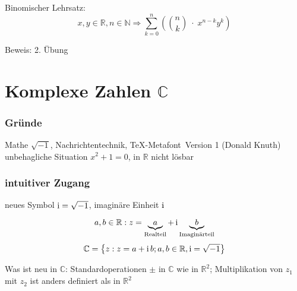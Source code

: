 \begin{proposition} Binomischer Lehrsatz:
 \begin{equation*} x,y \in \mathbb{R}, n \in \mathbb{N} \Rightarrow \sum_{k=0}^n \left( {n \choose k} \;\cdot\; x^{n-k}y^k \right) \end{equation*}
\end{proposition}
%
Beweis: 2. Übung

\section{Komplexe Zahlen $\mathbb{C}$}

\subsubsection*{Gründe}

Mathe $\sqrt{-1}$, Nachrichtentechnik, \TeX-Metafont\  Version 1 (Donald Knuth)\\
unbehagliche Situation $x^2+1=0$, in $\mathbb{R}$ nicht lösbar

\subsubsection*{intuitiver Zugang}

neues Symbol $\operatorname{i} = \sqrt{-1}$, imaginäre Einheit $\operatorname{i}$

\begin{definition}
  \begin{equation*} a, b \in \mathbb{R}: z = \underbrace{a}_\text{Realteil} + \operatorname{i} \underbrace{b}_\text{Imaginärteil} \end{equation*}
  \begin{equation*} \mathbb{C} = \left\{ z : z = a+\operatorname{i} b; a,b \in \mathbb{R}, \operatorname{i} = \sqrt{-1} \right\} \end{equation*}
\end{definition}
%
Was ist neu in $\mathbb{C}$: Standardoperationen $\pm$ in $\mathbb{C}$ wie in $\mathbb{R}^2$; Multiplikation von $z_1$ mit $z_2$ ist anders definiert als in $\mathbb{R}^2$